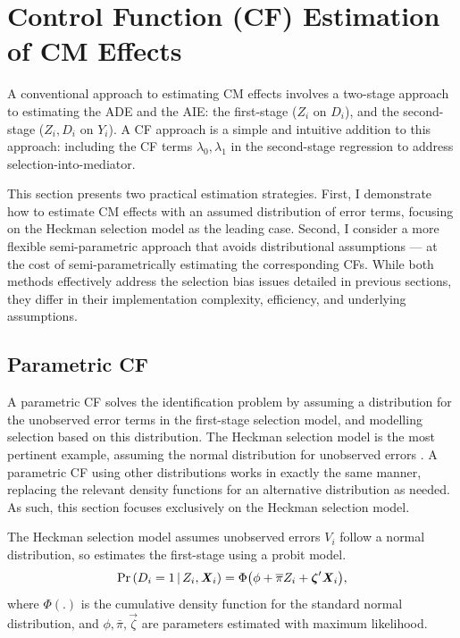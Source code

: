 \section{Control Function (CF) Estimation of CM Effects}
\label{sec:controlfun}
A conventional approach to estimating CM effects involves a two-stage approach to estimating the ADE and the AIE: the first-stage ($Z_i$ on $D_i$), and the second-stage ($Z_i, D_i$ on $Y_i$).
A CF approach is a simple and intuitive addition to this approach: including the CF terms $\lambda_0, \lambda_1$ in the second-stage regression to address selection-into-mediator.

This section presents two practical estimation strategies.
First, I demonstrate how to estimate CM effects with an assumed distribution of error terms, focusing on the Heckman selection model as the leading case.
Second, I consider a more flexible semi-parametric approach that avoids distributional assumptions --- at the cost of semi-parametrically estimating the corresponding CFs.
While both methods effectively address the selection bias issues detailed in previous sections, they differ in their implementation complexity, efficiency, and underlying assumptions.

\subsection{Parametric CF}
A parametric CF solves the identification problem by assuming a distribution for the unobserved error terms in the first-stage selection model, and modelling selection based on this distribution.
The Heckman selection model is the most pertinent example, assuming the normal distribution for unobserved errors \citep{heckman1979sample}.
A parametric CF using other distributions works in exactly the same manner, replacing the relevant density functions for an alternative distribution as needed.
As such, this section focuses exclusively on the Heckman selection model.

The Heckman selection model assumes unobserved errors $V_i$ follow a normal distribution, so estimates the first-stage using a probit model.
\[ \Pr\left( D_i = 1 \, \middle\vert \, Z_i, \boldsymbol{\mathit{X}}_i \right)
    = \Phi \big( \phi + \overline{\pi} Z_i + \boldsymbol{\mathit{\zeta}}' \boldsymbol{\mathit{X}}_i \big), \]
where $\Phi(.)$ is the cumulative density function for the standard normal distribution, and $\phi, \bar\pi, \vec\zeta$ are parameters estimated with maximum likelihood.

